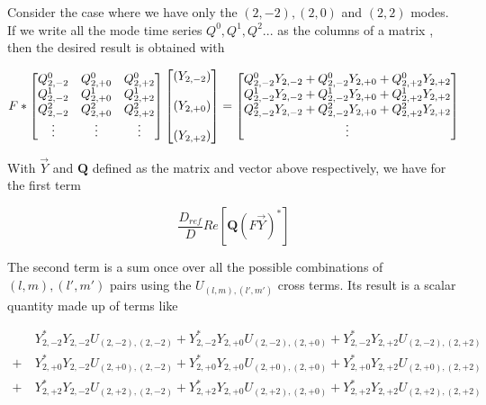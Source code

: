 \documentclass[paper=a4, fontsize=11pt]{scrartcl} %
\numberwithin{equation}{section} %
\numberwithin{figure}{section} %
\numberwithin{table}{section} %
\begin{document}
Consider the case where we have only the $(2,-2), (2,0)$ and $(2,2)$ modes. If we write all the mode time series $Q^0, Q^1, Q^2...$ as the columns of a matrix , then the desired result is obtained with

\begin{align}
F*
\begin{bmatrix}
Q^0_{2,-2} & Q^0_{2,+0} & Q^0_{2,+2} \\
Q^1_{2,-2} & Q^1_{2,+0} & Q^1_{2,+2} \\ 
Q^2_{2,-2} & Q^2_{2,+0} & Q^2_{2,+2} \\
\vdots & \vdots & \vdots
\end{bmatrix}
\begin{bmatrix}
\left(Y_{2,-2}\right)\\
\hspace{0mm} \\
\left(Y_{2,+0}\right) \\
\hspace{0mm} \\
\left(Y_{2,+2}\right) \\
\end{bmatrix}
=
\begin{bmatrix}
Q^0_{2,-2} Y_{2,-2} + Q^0_{2,-2}Y_{2,+0} + Q^0_{2,+2}Y_{2,+2} \\
Q^1_{2,-2} Y_{2,-2} + Q^1_{2,-2}Y_{2,+0} + Q^1_{2,+2}Y_{2,+2} \\
Q^2_{2,-2} Y_{2,-2} + Q^2_{2,-2}Y_{2,+0} + Q^2_{2,+2}Y_{2,+2} \\
\vdots
\end{bmatrix}
\end{align}

With $\vec{Y}$ and $\mathbf{Q}$ defined as the matrix and vector above respectively, we have for the first term

\begin{equation}
\frac{D_{ref}}{D}Re\left[\mathbf{Q}\left(F\vec{Y}\right)^{*}\right]
\end{equation}

The second term is a sum once over all the possible combinations of $(l,m), (l',m')$ pairs using the $U_{(l,m),(l',m')}$ cross terms. Its result is a scalar quantity made up of terms like

\begin{align}
&Y_{2,-2}^{*}Y_{2,-2}U_{(2,-2),(2,-2)} + Y_{2,-2}^{*}Y_{2,+0}U_{(2,-2),(2,+0)} + Y_{2,-2}^{*}Y_{2,+2}U_{(2,-2),(2,+2)} \\ 
 +  \ &Y_{2,+0}^{*}Y_{2,-2}U_{(2,+0),(2,-2)} + Y_{2,+0}^{*}Y_{2,+0}U_{(2,+0),(2,+0)} + Y_{2,+0}^{*}Y_{2,+2}U_{(2,+0),(2,+2)} \\ 
+ \  &Y_{2,+2}^{*}Y_{2,-2}U_{(2,+2),(2,-2)} + Y_{2,+2}^{*}Y_{2,+0}U_{(2,+2),(2,+0)} + Y_{2,+2}^{*}Y_{2,+2}U_{(2,+2),(2,+2)}
\end{align}
\end{document}
